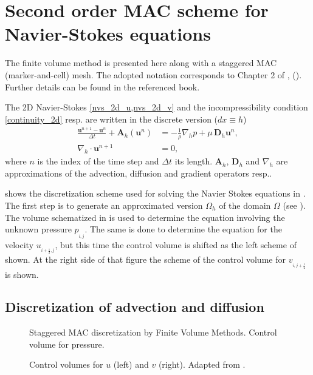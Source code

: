 \chapter{Second order MAC scheme for Navier-Stokes equations} %
\label{chap:appendix_MAC} %


The finite volume method is presented here along with a staggered MAC (marker-and-cell) mesh. The adopted notation corresponds to Chapter 2 of , \citeauthor{prosperetti2009} (\citeyear{prosperetti2009}). Further details can be found in the referenced book. 

The 2D Navier-Stokes \eqref{nvs_2d_u,nvs_2d_v} and the incompressibility condition \eqref*{continuity_2d} resp. are written in the discrete version ($dx\equiv h$)
\begin{align}
\frac{\mathbf{u}^{n+1}-\mathbf{u}^n}{\Delta t}+\mathbf{A}_h(\mathbf{u}^n)&=-\frac{1}{\rho}\nabla_hp+\mu\,\mathbf{D}_h \mathbf{u}^n,\label{eq:ap_nvs}\\
\nabla_h\cdot \mathbf{u}^{n+1}&=0,\label{eq:ap_incomp_cond}
\end{align}
where $n$ is the index of the time step and $\Delta t$ its length. $\mathbf{A}_h$, $\mathbf{D}_h$ and $\nabla_h$ are approximations of the advection, diffusion and gradient operators resp..

 shows the discretization scheme used for solving the Navier Stokes equations in . The first step is to generate an approximated version $\Omega_h$ of the domain $\Omega$ (see ). The volume schematized in  is used to determine the equation involving the unknown pressure $p_{\!_{i,j}}$. The same is done to determine the equation for the velocity $u_{\!_{i+\frac{1}{2},j}}$, but this time the control volume is shifted as the left scheme of  shown. At the right side of that figure the scheme of the control volume for $v_{\!_{i,j+\frac{1}{2}}}$ is shown.

\section{Discretization of advection and diffusion}
\begin{figure}[ht]
 \centering 
 \def\svgwidth{\textwidth}	
\caption[Staggered MAC discretization scheme]{Staggered MAC discretization by Finite Volume Methods. Control volume for pressure.}\label{fig:omega_h_staggered}
\end{figure}
\begin{figure}[hb]
 \centering 
 \def\svgwidth{\textwidth}	
\caption[Staggered MAC control volumes for velocities]{Control volumes for $u$ (left) and $v$ (right). Adapted from \cite{prosperetti2009}.}\label{fig:control_volume_uv}
\end{figure}

